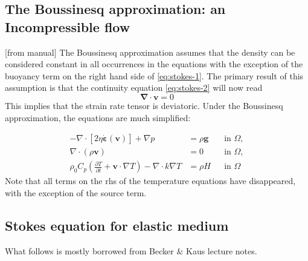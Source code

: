 \newpage
\subsection{The Boussinesq approximation: an Incompressible flow}


[from \aspect{} manual]
The Boussinesq approximation assumes that the density can be
considered constant in all occurrences in the equations with the exception of
the buoyancy term on the right hand side of \eqref{eq:stokes-1}. The primary
result of this assumption is that the continuity equation \eqref{eq:stokes-2}
will now read
\[
{\bm \nabla}\cdot{\bm v} = 0
\]
This implies that the strain rate tensor is deviatoric.
Under the Boussinesq approximation, the equations are much simplified:

\begin{align}
  \label{eq:stokes-1}
  -\nabla \cdot \left[2\eta \dot{\bm \varepsilon}(\bm v)
                \right] + \nabla p &=
  \rho \bm g
  &
  & \textrm{in $\Omega$},
  \\
  \label{eq:stokes-2}
  \nabla \cdot (\rho \bm v) &= 0
  &
  & \textrm{in $\Omega$},
  \\
  \label{eq:temperature}
  \rho_0 C_p \left(\frac{\partial T}{\partial t} + \bm v\cdot\nabla T\right)
  - \nabla\cdot k\nabla T
  &=
  \rho H
  &
  & \textrm{in $\Omega$}
\end{align}
Note that all terms on the rhs of the temperature equations have disappeared, with the exception 
of the source term.


\newpage
\subsection{Stokes equation for elastic medium}

What follows is mostly borrowed from Becker \& Kaus lecture notes.


